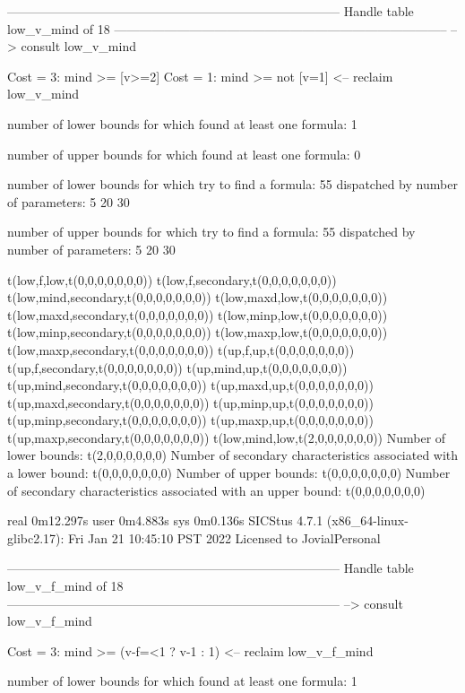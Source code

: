 --------------------------------------------------------------------------------
Handle table low_v_mind of 18
--------------------------------------------------------------------------------
--> consult low_v_mind

Cost =  3:  mind >= [v>=2]
Cost =  1:  mind >= not [v=1]
<-- reclaim low_v_mind

number of lower bounds for which found at least one formula: 1

number of upper bounds for which found at least one formula: 0

number of lower bounds for which try to find a formula: 55
dispatched by number of parameters: 5  20  30

number of upper bounds for which try to find a formula: 55
dispatched by number of parameters: 5  20  30

t(low,f,low,t(0,0,0,0,0,0,0))
t(low,f,secondary,t(0,0,0,0,0,0,0))
t(low,mind,secondary,t(0,0,0,0,0,0,0))
t(low,maxd,low,t(0,0,0,0,0,0,0))
t(low,maxd,secondary,t(0,0,0,0,0,0,0))
t(low,minp,low,t(0,0,0,0,0,0,0))
t(low,minp,secondary,t(0,0,0,0,0,0,0))
t(low,maxp,low,t(0,0,0,0,0,0,0))
t(low,maxp,secondary,t(0,0,0,0,0,0,0))
t(up,f,up,t(0,0,0,0,0,0,0))
t(up,f,secondary,t(0,0,0,0,0,0,0))
t(up,mind,up,t(0,0,0,0,0,0,0))
t(up,mind,secondary,t(0,0,0,0,0,0,0))
t(up,maxd,up,t(0,0,0,0,0,0,0))
t(up,maxd,secondary,t(0,0,0,0,0,0,0))
t(up,minp,up,t(0,0,0,0,0,0,0))
t(up,minp,secondary,t(0,0,0,0,0,0,0))
t(up,maxp,up,t(0,0,0,0,0,0,0))
t(up,maxp,secondary,t(0,0,0,0,0,0,0))
t(low,mind,low,t(2,0,0,0,0,0,0))
Number of lower bounds:                                             t(2,0,0,0,0,0,0)
Number of secondary characteristics associated with a lower bound:  t(0,0,0,0,0,0,0)
Number of upper bounds:                                             t(0,0,0,0,0,0,0)
Number of secondary characteristics associated with an upper bound: t(0,0,0,0,0,0,0)

real	0m12.297s
user	0m4.883s
sys	0m0.136s
SICStus 4.7.1 (x86_64-linux-glibc2.17): Fri Jan 21 10:45:10 PST 2022
Licensed to JovialPersonal


--------------------------------------------------------------------------------
Handle table low_v_f_mind of 18
--------------------------------------------------------------------------------
--> consult low_v_f_mind

Cost =  3:  mind >= (v-f=<1 ? v-1 : 1)
<-- reclaim low_v_f_mind

number of lower bounds for which found at least one formula: 1

